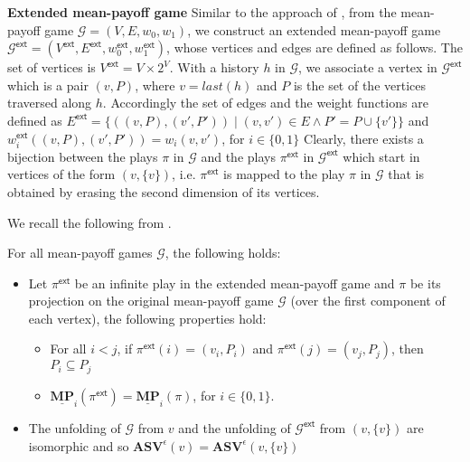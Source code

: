 \textbf{Extended mean-payoff game} Similar to the approach of \cite{FGR20}, from the mean-payoff game $\mathcal{G} = (V, E, w_0, w_1)$,  we construct an extended mean-payoff game $\mathcal{G}^{\mathsf{ext}} = (V^{\mathsf{ext}}, E^{\mathsf{ext}}, w_0^{\mathsf{ext}}, w_1^{\mathsf{ext}})$, whose vertices and edges are defined as follows. The set of vertices is $V^{\mathsf{ext}} = V \times 2^V$. With a history $h$ in $\mathcal{G}$, we associate a vertex in $\mathcal{G}^{\mathsf{ext}}$ which is a pair $(v, P)$, where $v = last(h)$ and $P$ is the set of the vertices traversed along $h$. Accordingly the set of edges and the weight functions are defined as $E^{\mathsf{ext}} = \{((v,P),(v', P')) \mid (v,v') \in E \land P' = P \cup \{v'\}\}$ and $w_i^{\mathsf{ext}}((v,P),(v', P')) = w_i(v, v')$, for $i \in \{0,1\}$ Clearly, there exists a bijection between the plays $\pi$ in $\mathcal{G}$ and the plays $\pi^{\mathsf{ext}}$ in $\mathcal{G}^{\mathsf{ext}}$ which start in vertices of the form $(v, \{v\})$, i.e. $\pi^{\mathsf{ext}}$ is mapped to the play $\pi$ in $\mathcal{G}$ that is obtained by erasing the second dimension of its vertices.

We recall the following from \cite{FGR20}.
\begin{proposition}
\label{PropExtGamePlayConverges}
For all mean-payoff games $\mathcal{G}$, the following holds:

\begin{itemize}
    \item Let $\pi^{\mathsf{ext}}$ be an infinite play in the extended mean-payoff game and $\pi$ be its projection on the original mean-payoff game $\mathcal{G}$ (over the first component of each vertex), the following properties hold: \begin{itemize}
        \item For all $i < j$, if $\pi^{\mathsf{ext}}(i) = (v_i, P_i)$ and $\pi^{\mathsf{ext}}(j) = (v_j, P_j)$, then $P_i \subseteq P_j$
        \item $\underline{\mathbf{MP}}_i(\pi^{\mathsf{ext}}) = \underline{\mathbf{MP}}_i(\pi)$, for $i \in \{0,1\}$.
    \end{itemize}
    \item The unfolding of $\mathcal{G}$ from $v$ and the unfolding of $\mathcal{G}^{\mathsf{ext}}$ from $(v, \{v\})$ are isomorphic and so $\mathbf{ASV}^{\epsilon}(v) = \mathbf{ASV}^{\epsilon}(v, \{v\})$
\end{itemize}
\end{proposition}


